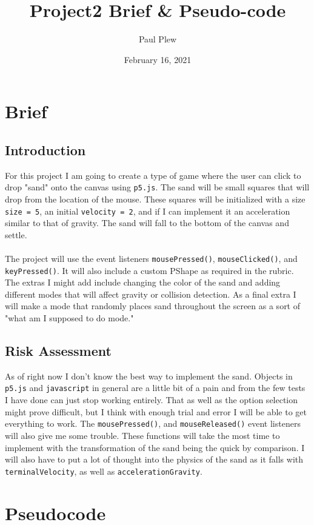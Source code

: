 \documentclass[12 pt]{report}
\title{Project2 Brief \& Pseudo-code}
\author{Paul Plew}
\date{February 16, 2021}
\begin{document}
\maketitle

\section{Brief}
\subsection{Introduction}
For this project I am going to create a type of game where the user can click to drop "sand" onto the canvas using \verb|p5.js|. The sand will be small squares that will drop from the location of the mouse. These squares will be initialized with a size \verb|size = 5|, an initial \verb|velocity = 2|, and if I can implement it an  acceleration similar to that of gravity. The sand will fall to the bottom of the canvas and settle. \\ \\
The project will use the event listeners \verb|mousePressed()|, \verb|mouseClicked()|, and \verb|keyPressed()|. It will also include a custom PShape as required in the rubric. The extras I might add include changing the color of the sand and adding different modes that will affect gravity or collision detection. As a final extra I will make a mode that randomly places sand throughout the screen as a sort of "what am I supposed to do mode." 
\subsection{Risk Assessment}
As of right now I don't know the best way to implement the sand. Objects in \verb|p5.js| and \verb|javascript| in general are a little bit of a pain and from the few tests I have done can just stop working entirely. That as well as the option selection might prove difficult, but I think with enough trial and error I will be able to get everything to work. The \verb|mousePressed()|, and \verb|mouseReleased()| event listeners will also give me some trouble. These functions will take the most time to implement with the transformation of the sand being the quick by comparison. I will also have to put a lot of thought into the physics of the sand as it falls with \verb|terminalVelocity|, as well as \verb|accelerationGravity|.
\newpage
\section{Pseudocode}
\end{document}
